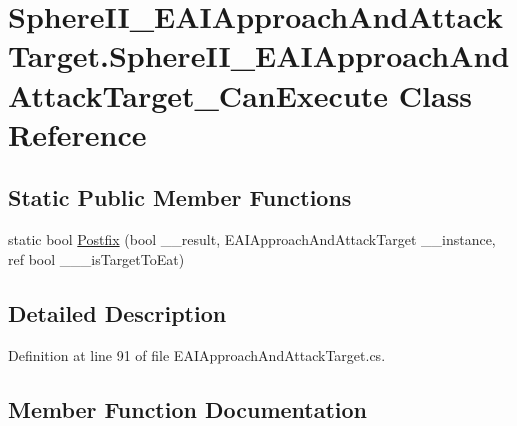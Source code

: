 \hypertarget{class_sphere_i_i___e_a_i_approach_and_attack_target_1_1_sphere_i_i___e_a_i_approach_and_attack_target___can_execute}{}\section{Sphere\+I\+I\+\_\+\+E\+A\+I\+Approach\+And\+Attack\+Target.\+Sphere\+I\+I\+\_\+\+E\+A\+I\+Approach\+And\+Attack\+Target\+\_\+\+Can\+Execute Class Reference}
\label{class_sphere_i_i___e_a_i_approach_and_attack_target_1_1_sphere_i_i___e_a_i_approach_and_attack_target___can_execute}
\subsection*{Static Public Member Functions}
\begin{DoxyCompactItemize}
\item 
static bool \mbox{\hyperlink{class_sphere_i_i___e_a_i_approach_and_attack_target_1_1_sphere_i_i___e_a_i_approach_and_attack_target___can_execute_a36d83345ae3a7e77dc3dea08e7c79418}{Postfix}} (bool \+\_\+\+\_\+result, E\+A\+I\+Approach\+And\+Attack\+Target \+\_\+\+\_\+instance, ref bool \+\_\+\+\_\+\+\_\+is\+Target\+To\+Eat)
\end{DoxyCompactItemize}


\subsection{Detailed Description}


Definition at line 91 of file E\+A\+I\+Approach\+And\+Attack\+Target.\+cs.



\subsection{Member Function Documentation}
\mbox{\label{class_sphere_i_i___e_a_i_approach_and_attack_target_1_1_sphere_i_i___e_a_i_approach_and_attack_target___can_execute_a36d83345ae3a7e77dc3dea08e7c79418}} 
